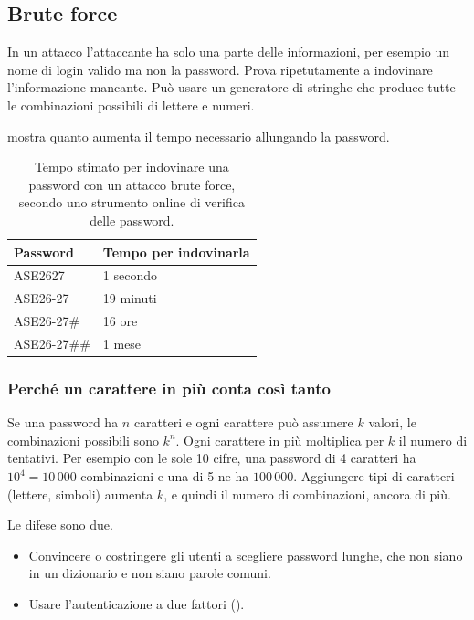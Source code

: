 \subsection{Brute force}
\label{sec:sic-brute}

In un attacco  l'attaccante ha solo una parte delle informazioni, per esempio un nome di login
valido ma non la password. Prova ripetutamente a indovinare l'informazione mancante. Può usare un generatore di
stringhe che produce tutte le combinazioni possibili di lettere e numeri.

 mostra quanto aumenta il tempo necessario allungando la password.

\begin{table}[ht]
\centering
\small
\caption{Tempo stimato per indovinare una password con un attacco brute force, secondo uno strumento online di
verifica delle password.}
\label{tab:sic-password}
\begin{tabular}{>{\ttfamily}ll}
\toprule
\normalfont Password & Tempo per indovinarla \\
\midrule
ASE2627 & 1 secondo \\
ASE26-27 & 19 minuti \\
ASE26-27\# & 16 ore \\
ASE26-27\#\# & 1 mese \\
\bottomrule
\end{tabular}
\end{table}

\subsubsection{Perché un carattere in più conta così tanto\aggiunta}
Se una password ha $n$ caratteri e ogni carattere può assumere $k$ valori, le combinazioni possibili sono $k^n$. Ogni
carattere in più moltiplica per $k$ il numero di tentativi. Per esempio con le sole 10 cifre, una password di 4
caratteri ha $10^4 = 10\,000$ combinazioni e una di 5 ne ha $100\,000$. Aggiungere tipi di caratteri (lettere,
simboli) aumenta $k$, e quindi il numero di combinazioni, ancora di più.

Le difese sono due.
\begin{itemize}
  \item Convincere o costringere gli utenti a scegliere password lunghe, che non siano in un dizionario e non siano
    parole comuni.
  \item Usare l'autenticazione a due fattori ().
\end{itemize}

